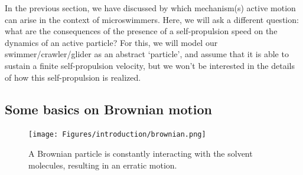 In the previous section, we have discussed by which mechanism(s) active motion can arise in the context of microswimmers.
Here, we will ask a different question: what are the consequences of the presence of a self-propulsion speed on the dynamics of an active particle?
For this, we will model our swimmer/crawler/glider as an abstract `particle', and assume that it is able to sustain a finite self-propulsion velocity, but we won't be interested in the details of how this self-propulsion is realized.


\subsection*{Some basics on Brownian motion}

\begin{figure}[!htb]
    \centering
    \texttt{[image: Figures/introduction/brownian.png]}
    \caption{A Brownian particle is constantly interacting with the solvent molecules, resulting in an erratic motion.}
    \label{fig: brownian}
\end{figure}

